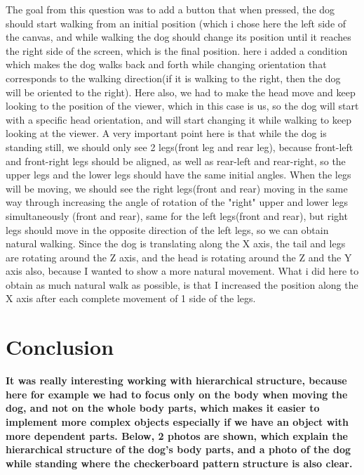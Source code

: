 \documentclass{article}
\begin{document}
\begin{enumerate}
The goal from this question was to add a button that when pressed, the dog should start walking from an initial position (which i chose here the left side of the canvas, and while walking the dog should change its position until it reaches the right side of the screen, which is the final position. here i added a condition which makes the dog walks back and forth while changing orientation that corresponds to the walking direction(if it is walking to the right, then the dog will be oriented to the right). Here also, we had to make the head move and keep looking to the position of the viewer, which in this case is us, so the dog will start with a specific head orientation, and will start changing it while walking to keep looking at the viewer. A very important point here is that while the dog is standing still, we should only see 2 legs(front leg and rear leg), because front-left and front-right legs should be aligned, as well as rear-left and rear-right, so the upper legs and the lower legs should have the same initial angles. When the legs will be moving, we should see the right legs(front and rear) moving in the same way through increasing the angle of rotation of the "right" upper and lower legs simultaneously (front and rear), same for the left legs(front and rear), but right legs should move in the opposite direction of the left legs, so we can obtain natural walking. Since the dog is translating along the X axis, the tail and legs are rotating around the Z axis, and the head is rotating around the Z and the Y axis also, because I wanted to show a more natural movement. What i did here to obtain as much natural walk as possible, is that I increased the position along the X axis after each complete movement  of 1 side of the legs.



\section {Conclusion}
\textbf{It was really interesting working with hierarchical structure, because here for example we had to focus only on the body when moving the dog, and not on the whole body parts, which makes it easier to implement more complex objects especially if we have an object with more dependent parts. Below, 2 photos are shown, which explain the hierarchical structure of the dog's body parts, and a photo of the dog while standing where the checkerboard pattern structure is also clear.}








\end{enumerate}
\end{document}
